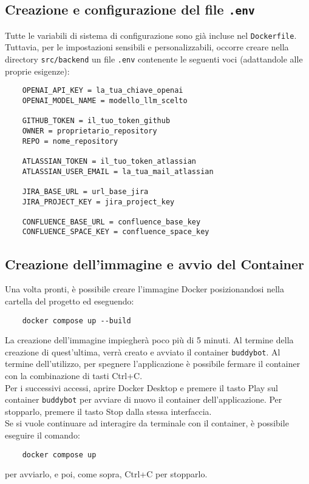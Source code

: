 \subsection{Creazione e configurazione del file \texttt{.env}}
Tutte le variabili di sistema di configurazione sono già incluse nel \texttt{Dockerfile}.  
Tuttavia, per le impostazioni sensibili e personalizzabili, occorre creare nella directory \texttt{src/backend} un file
\texttt{.env} contenente le seguenti voci (adattandole alle proprie esigenze):
\begin{verbatim}
    OPENAI_API_KEY = la_tua_chiave_openai
    OPENAI_MODEL_NAME = modello_llm_scelto

    GITHUB_TOKEN = il_tuo_token_github
    OWNER = proprietario_repository
    REPO = nome_repository

    ATLASSIAN_TOKEN = il_tuo_token_atlassian
    ATLASSIAN_USER_EMAIL = la_tua_mail_atlassian

    JIRA_BASE_URL = url_base_jira
    JIRA_PROJECT_KEY = jira_project_key

    CONFLUENCE_BASE_URL = confluence_base_key
    CONFLUENCE_SPACE_KEY = confluence_space_key
\end{verbatim}

\subsection{Creazione dell'immagine e avvio del Container}
Una volta pronti, è possibile creare l'immagine Docker posizionandosi nella cartella del progetto ed eseguendo:
\begin{verbatim}
    docker compose up --build
\end{verbatim}
La creazione dell'immagine impiegherà poco più di 5 minuti.
Al termine della creazione di quest'ultima, verrà creato e avviato il container \texttt{buddybot}. Al termine dell'utilizzo, per
spegnere l'applicazione è possibile fermare il container con la combinazione di tasti Ctrl+C.\\
Per i successivi accessi, aprire Docker Desktop e premere il tasto Play sul container \texttt{buddybot} per avviare di nuovo il
container dell'applicazione. Per stopparlo, premere il tasto Stop dalla stessa interfaccia.\\
Se si vuole continuare ad interagire da terminale con il container, è possibile eseguire il comando:
\begin{verbatim}
    docker compose up
\end{verbatim}
per avviarlo, e poi, come sopra, Ctrl+C per stopparlo.

